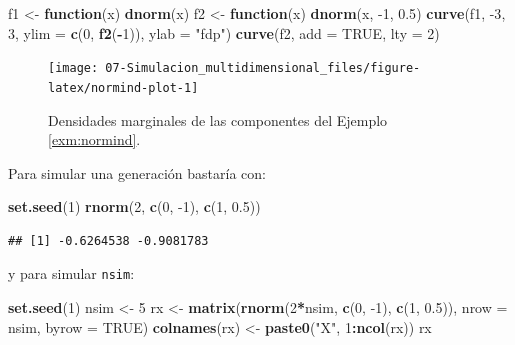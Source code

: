 \documentclass[
]{book}
\newenvironment{Shaded}{\begin{snugshade}}{\end{snugshade}}
\newcommand{\ControlFlowTok}[1]{\textcolor[rgb]{0.13,0.29,0.53}{\textbf{#1}}}
\newcommand{\DataTypeTok}[1]{\textcolor[rgb]{0.13,0.29,0.53}{#1}}
\newcommand{\DecValTok}[1]{\textcolor[rgb]{0.00,0.00,0.81}{#1}}
\newcommand{\FloatTok}[1]{\textcolor[rgb]{0.00,0.00,0.81}{#1}}
\newcommand{\KeywordTok}[1]{\textcolor[rgb]{0.13,0.29,0.53}{\textbf{#1}}}
\newcommand{\NormalTok}[1]{#1}
\newcommand{\OperatorTok}[1]{\textcolor[rgb]{0.81,0.36,0.00}{\textbf{#1}}}
\newcommand{\OtherTok}[1]{\textcolor[rgb]{0.56,0.35,0.01}{#1}}
\newcommand{\StringTok}[1]{\textcolor[rgb]{0.31,0.60,0.02}{#1}}
\theoremstyle{break}
\theoremstyle{definition}
\theoremstyle{definition}
\theoremstyle{definition}
\theoremstyle{remark}
\begin{document}
\begin{Shaded}
\begin{Highlighting}[]
\NormalTok{f1 <-}\StringTok{ }\ControlFlowTok{function}\NormalTok{(x) }\KeywordTok{dnorm}\NormalTok{(x)}
\NormalTok{f2 <-}\StringTok{ }\ControlFlowTok{function}\NormalTok{(x) }\KeywordTok{dnorm}\NormalTok{(x, }\DecValTok{-1}\NormalTok{, }\FloatTok{0.5}\NormalTok{)}
\KeywordTok{curve}\NormalTok{(f1, }\DecValTok{-3}\NormalTok{, }\DecValTok{3}\NormalTok{, }\DataTypeTok{ylim =} \KeywordTok{c}\NormalTok{(}\DecValTok{0}\NormalTok{, }\KeywordTok{f2}\NormalTok{(}\OperatorTok{-}\DecValTok{1}\NormalTok{)), }\DataTypeTok{ylab =} \StringTok{"fdp"}\NormalTok{)}
\KeywordTok{curve}\NormalTok{(f2, }\DataTypeTok{add =} \OtherTok{TRUE}\NormalTok{, }\DataTypeTok{lty =} \DecValTok{2}\NormalTok{)}
\end{Highlighting}
\end{Shaded}

\begin{figure}[!htb]

{\centering \texttt{[image: 07-Simulacion\_multidimensional\_files/figure-latex/normind-plot-1]} 

}

\caption{Densidades marginales de las componentes del Ejemplo \ref{exm:normind}.}\label{fig:normind-plot}
\end{figure}

Para simular una generación bastaría con:

\begin{Shaded}
\begin{Highlighting}[]
\KeywordTok{set.seed}\NormalTok{(}\DecValTok{1}\NormalTok{)}
\KeywordTok{rnorm}\NormalTok{(}\DecValTok{2}\NormalTok{, }\KeywordTok{c}\NormalTok{(}\DecValTok{0}\NormalTok{, }\DecValTok{-1}\NormalTok{), }\KeywordTok{c}\NormalTok{(}\DecValTok{1}\NormalTok{, }\FloatTok{0.5}\NormalTok{))}
\end{Highlighting}
\end{Shaded}

\begin{verbatim}
## [1] -0.6264538 -0.9081783
\end{verbatim}

y para simular \texttt{nsim}:

\begin{Shaded}
\begin{Highlighting}[]
\KeywordTok{set.seed}\NormalTok{(}\DecValTok{1}\NormalTok{)}
\NormalTok{nsim <-}\StringTok{ }\DecValTok{5}
\NormalTok{rx <-}\StringTok{ }\KeywordTok{matrix}\NormalTok{(}\KeywordTok{rnorm}\NormalTok{(}\DecValTok{2}\OperatorTok{*}\NormalTok{nsim, }\KeywordTok{c}\NormalTok{(}\DecValTok{0}\NormalTok{, }\DecValTok{-1}\NormalTok{), }\KeywordTok{c}\NormalTok{(}\DecValTok{1}\NormalTok{, }\FloatTok{0.5}\NormalTok{)), }\DataTypeTok{nrow =}\NormalTok{ nsim, }\DataTypeTok{byrow =} \OtherTok{TRUE}\NormalTok{)}
\KeywordTok{colnames}\NormalTok{(rx) <-}\StringTok{ }\KeywordTok{paste0}\NormalTok{(}\StringTok{"X"}\NormalTok{, }\DecValTok{1}\OperatorTok{:}\KeywordTok{ncol}\NormalTok{(rx))}
\NormalTok{rx}
\end{Highlighting}
\end{Shaded}
\end{document}
